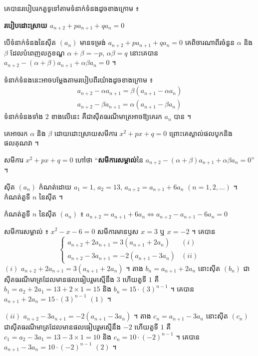 គេបានរបៀបរកតួទូទៅតាមទំនាក់ទំនងដូចខាងក្រោម ៖

\begin{formulaBox}[ជាទូទៅ]
\textbf{របៀបដោះស្រាយ $a_{n+2} + pa_{n+1} + qa_n = 0$}

បើទំនាក់ទំនងនៃស៊ីត $(a_n)$ មានទម្រង់ $a_{n+2} + pa_{n+1} + qa_n = 0$ គេពិចារណាពីរចំនួន $\alpha$ និង $\beta$ ដែលបំពេញលក្ខខណ្ឌ $\alpha + \beta = -p$, $\alpha\beta = q$ នោះគេបាន $a_{n+2} - (\alpha + \beta)a_{n+1} + \alpha\beta a_n = 0$ ។

ទំនាក់ទំនងនេះអាចបម្លែងតាមរបៀបពីរយ៉ាងដូចខាងក្រោម ៖
\[
\begin{gathered}
a_{n+2} - \alpha a_{n+1} = \beta(a_{n+1} - \alpha a_n)\\
a_{n+2} - \beta a_{n+1} = \alpha(a_{n+1} - \beta a_n)
\end{gathered}
\]
ទំនាក់ទំនងទាំង $2$ ខាងលើនេះ គឺជាស៊ីតធរណីមាត្រអាចឱ្យគេរក $a_n$ បាន ។

គេអាចរក $\alpha$ និង $\beta$ ដោយដោះស្រាយសមីការ $x^2 + px + q = 0$ ព្រោះគេស្គាល់ផលបូកនិងផលគុណវា ។

សមីការ $x^2 + px + q = 0$ ហៅថា ``\textbf{សមីការសម្គាល់}នៃ $a_{n+2} - (\alpha + \beta)a_{n+1} + \alpha\beta a_n = 0$'' ។
\end{formulaBox}

\begin{example}[លំហាត់គំរូ]
ស៊ីត $(a_n)$ កំណត់ដោយ $a_1 = 1$, $a_2 = 13$, $a_{n+2} = a_{n+1} + 6a_n$ $(n = 1, 2, \ldots)$ ។ កំណត់តួទី $n$ នៃស៊ីត ។
\end{example}
\ans
កំណត់តួទី $n$ នៃស៊ីត $(a_n)$ ៖ $a_{n+2} = a_{n+1} + 6a_n \iff a_{n+2} - a_{n+1} - 6a_n = 0$

សមីការសម្គាល់ ៖ $x^2 - x - 6 = 0$ សមីការមានឫស $x = 3$ ឬ $x = -2$ ។ គេបាន
\[
\begin{cases}
a_{n+2} + 2a_{n+1} = 3(a_{n+1} + 2a_n) & (i)\\
a_{n+2} - 3a_{n+1} = -2(a_{n+1} - 3a_n) & (ii)
\end{cases}
\]
$(i)$ \quad $a_{n+2} + 2a_{n+1} = 3(a_{n+1} + 2a_n)$ ។ តាង $b_n = a_{n+1} + 2a_n$ នោះស៊ីត $(b_n)$ ជាស៊ីតធរណីមាត្រដែលមានផលធៀបរួមស្មើនឹង $3$ ហើយតួទី $1$ គឺ $b_1 = a_2 + 2a_1 = 13 + 2 \times 1 = 15$ និង $b_n = 15 \cdot (3)^{n-1}$ ។ គេបាន $a_{n+1} + 2a_n = 15 \cdot (3)^{n-1}$ \quad $(1)$ ។

$(ii)$ \quad $a_{n+2} - 3a_{n+1} = -2(a_{n+1} - 3a_n)$ ។ តាង $c_n = a_{n+1} - 3a_n$ នោះស៊ីត $(c_n)$ ជាស៊ីតធរណីមាត្រដែលមានផលធៀបរួមស្មើនឹង $-2$ ហើយតួទី $1$ គឺ $c_1 = a_2 - 3a_1 = 13 - 3 \times 1 = 10$ និង $c_n = 10 \cdot (-2)^{n-1}$ ។ គេបាន $a_{n+1} - 3a_n = 10 \cdot (-2)^{n-1}$ \quad $(2)$ ។

